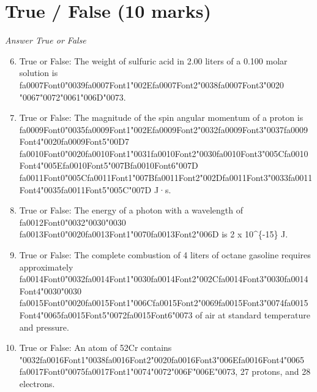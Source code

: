 \documentclass[12pt]{article}
\begin{document}
\section*{True / False (10 marks)}
\textit{Answer True or False}
\begin{enumerate}[label=\arabic*.]
\setcounter{enumi}{5}
\item True or False: The weight of sulfuric acid in 2.00 liters of a 0.100 molar solution is {\csname fa0007Font0\endcsname\char"0039}{\csname fa0007Font1\endcsname\char"002E}{\csname fa0007Font2\endcsname\char"0038}{\csname fa0007Font3\endcsname\char"0020} {\char"0067}{\char"0072}{\char"0061}{\char"006D}{\char"0073}.
\item True or False: The magnitude of the spin angular momentum of a proton is {\csname fa0009Font0\endcsname\char"0035}{\csname fa0009Font1\endcsname\char"002E}{\csname fa0009Font2\endcsname\char"0032}{\csname fa0009Font3\endcsname\char"0037}{\csname fa0009Font4\endcsname\char"0020}{\csname fa0009Font5\endcsname\char"00D7} {\csname fa0010Font0\endcsname\char"0020}{\csname fa0010Font1\endcsname\char"0031}{\csname fa0010Font2\endcsname\char"0030}{\csname fa0010Font3\endcsname\char"005C}{\csname fa0010Font4\endcsname\char"005E}{\csname fa0010Font5\endcsname\char"007B}{\csname fa0010Font6\endcsname\char"007D} {\csname fa0011Font0\endcsname\char"005C}{\csname fa0011Font1\endcsname\char"007B}{\csname fa0011Font2\endcsname\char"002D}{\csname fa0011Font3\endcsname\char"0033}{\csname fa0011Font4\endcsname\char"0035}{\csname fa0011Font5\endcsname\char"005C}{\char"007D} J·s.
\item True or False: The energy of a photon with a wavelength of {\csname fa0012Font0\endcsname\char"0032}{\char"0030}{\char"0030} {\csname fa0013Font0\endcsname\char"0020}{\csname fa0013Font1\endcsname\char"0070}{\csname fa0013Font2\endcsname\char"006D} is 2 x 10\^{}\{-15\} J.
\item True or False: The complete combustion of 4 liters of octane gasoline requires approximately {\csname fa0014Font0\endcsname\char"0032}{\csname fa0014Font1\endcsname\char"0030}{\csname fa0014Font2\endcsname\char"002C}{\csname fa0014Font3\endcsname\char"0030}{\csname fa0014Font4\endcsname\char"0030}{\char"0030} {\csname fa0015Font0\endcsname\char"0020}{\csname fa0015Font1\endcsname\char"006C}{\csname fa0015Font2\endcsname\char"0069}{\csname fa0015Font3\endcsname\char"0074}{\csname fa0015Font4\endcsname\char"0065}{\csname fa0015Font5\endcsname\char"0072}{\csname fa0015Font6\endcsname\char"0073} of air at standard temperature and pressure.
\item True or False: An atom of 52Cr contains {\char"0032}{\csname fa0016Font1\endcsname\char"0038}{\csname fa0016Font2\endcsname\char"0020}{\csname fa0016Font3\endcsname\char"006E}{\csname fa0016Font4\endcsname\char"0065} {\csname fa0017Font0\endcsname\char"0075}{\csname fa0017Font1\endcsname\char"0074}{\char"0072}{\char"006F}{\char"006E}{\char"0073}, 27 protons, and 28 electrons.
\end{enumerate}
\end{document}
